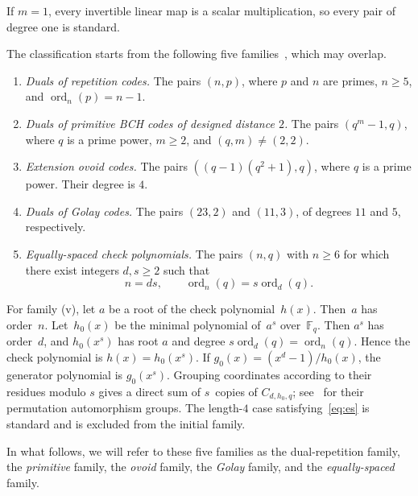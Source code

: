 \documentclass[11pt]{article}
\newcommand{\bbF}{{\mathbb{F}}}
\DeclareMathOperator{\ord}{ord}
\begin{document}
If $m=1$, every invertible linear map is a scalar multiplication,
so every pair of degree one is standard.

The classification starts from the following five
families~\cite[Section 3]{FHLX}, which may overlap.
\begin{enumerate}
\item[\rm (i)] \emph{Duals of repetition codes.} The pairs $(n,p)$,
where $p$ and $n$ are primes, $n\ge5$, and $\ord_n(p)=n-1$.
\item[\rm (ii)] \emph{Duals of primitive BCH codes of designed
distance $2$.} The pairs $(q^m-1,q)$, where $q$ is a prime power,
$m\ge2$, and $(q,m)\ne(2,2)$.
\item[\rm (iii)] \emph{Extension ovoid codes.} The pairs
$((q-1)(q^2+1),q)$, where $q$ is a prime power. Their degree is $4$.
\item[\rm (iv)] \emph{Duals of Golay codes.} The pairs $(23,2)$ and
$(11,3)$, of degrees $11$ and $5$, respectively.
\item[\rm (v)] \emph{Equally-spaced check polynomials.} The pairs
$(n,q)$ with $n\ge6$ for which there exist integers $d,s\ge2$ such that
\begin{equation}\label{eq:es}
 n=ds,\qquad \ord_n(q)=s\ord_d(q).
\end{equation}
\end{enumerate}

For family (v), let $a$ be a root of the check polynomial~$h(x)$. Then~$a$ has order~$n$. Let~$h_0(x)$ be the minimal polynomial of~$a^s$ over~$\bbF_q$. Then $a^s$ has order~$d$, and $h_0(x^s)$ has root $a$ and degree
$s\ord_d(q)=\ord_n(q)$. Hence the check polynomial is
$h(x)=h_0(x^s)$. If $g_0(x)=(x^d-1)/h_0(x)$, the generator
polynomial is $g_0(x^s)$. Grouping coordinates according to their
residues modulo $s$ gives a direct sum of $s$~copies of
$C_{d,h_0,q}$; see~\cite[Example 3.5 and Section 4]{FHLX} for
their permutation automorphism groups.
The length-$4$ case satisfying~\eqref{eq:es} is standard and is
excluded from the initial family.

In what follows, we will refer to these five families as the {dual-repetition\/} family, the {\em primitive\/} family, the {\em ovoid\/} family, the {\em Golay\/} family, and the {\em equally-spaced\/} family.
\end{document}

